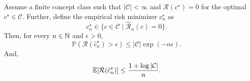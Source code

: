 
\begin{theorem} \label{thm:vapnik1974}
    Assume a finite concept class such that $|\mathcal{C}| < \infty$ and $\mathcal{R}(c^\star) = 0$
    for the optimal $c^\star \in \mathcal{C}$. Further, define the empirical risk minimizer
    $c_n^\star$ as  \[
        c^\star_n \in \{ c \in \mathcal{C} \mid \hat{\mathcal{R}}_n(c) = 0 \}.
    \]
    Then, for every $n \in \mathbb{N}$ and $\epsilon > 0$, \[
        \mathbb{P}(\mathcal{R}(\hat{c}^\star_n) > \epsilon) \leq |\mathcal{C}| \exp(-n \epsilon).
    \]
    And, \[
        \mathbb{E}[\mathcal{R}(\hat{c}^\star_n)] \leq \frac{1 + \log |\mathcal{C}|}{n}.
    \]
\end{theorem}

